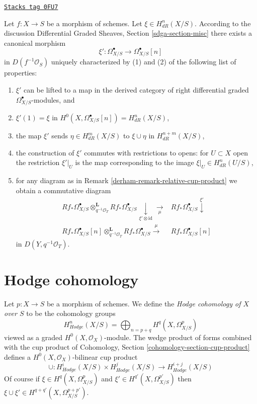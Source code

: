 \begin{remark}
\label{derham-remark-cup-product-as-a-map}
\href{https://stacks.math.columbia.edu/tag/0FU7}{\texttt{Stacks tag 0FU7}}

Let $f : X \to S$ be a morphism of schemes. Let $\xi \in H_{dR}^n(X/S)$.
According to the discussion
Differential Graded Sheaves, Section \ref{sdga-section-misc}
there exists a canonical morphism
$$
\xi' : \Omega^\bullet_{X/S} \to \Omega^\bullet_{X/S}[n]
$$
in $D(f^{-1}\mathcal{O}_S)$ uniquely characterized by
(1) and (2) of the following list of properties:
\begin{enumerate}
\item $\xi'$ can be lifted to a map in the derived category of right
differential graded $\Omega^\bullet_{X/S}$-modules, and
\item $\xi'(1) = \xi$ in
$H^0(X, \Omega^\bullet_{X/S}[n]) = H^n_{dR}(X/S)$,
\item the map $\xi'$ sends $\eta \in H^m_{dR}(X/S)$
to $\xi \cup \eta$ in $H^{n + m}_{dR}(X/S)$,
\item the construction of $\xi'$ commutes with restrictions to
opens: for $U \subset X$ open the restriction $\xi'|_U$ is
the map corresponding to the image $\xi|_U \in H^n_{dR}(U/S)$,
\item for any diagram as in Remark \ref{derham-remark-relative-cup-product}
we obtain a commutative diagram
$$
\begin{array}{cc}Rf_*\Omega^\bullet_{X/S}
\otimes_{q^{-1}\mathcal{O}_T}^\mathbf{L}
Rf_*\Omega^\bullet_{X/S} \underset{\xi' \otimes \text{id}}{\downarrow}\underset{\mu}{\longrightarrow} & Rf_*\Omega^\bullet_{X/S} \overset{\xi'}{\downarrow} \\ Rf_*\Omega^\bullet_{X/S}[n]
\otimes_{q^{-1}\mathcal{O}_T}^\mathbf{L}
Rf_*\Omega^\bullet_{X/S}
\overset{\mu}{\longrightarrow} & Rf_*\Omega^\bullet_{X/S}[n]\end{array}
$$
in $D(Y, q^{-1}\mathcal{O}_T)$.
\end{enumerate}
\end{remark}

\section{Hodge cohomology}
\label{derham-section-hodge-cohomology}
Let $p : X \to S$ be a morphism of schemes. We define the
{\it Hodge cohomology of $X$ over $S$} to be the cohomology groups
$$
H^n_{Hodge}(X/S) = \bigoplus\nolimits_{n = p + q} H^q(X, \Omega^p_{X/S})
$$
viewed as a graded $H^0(X, \mathcal{O}_X)$-module. The wedge product
of forms combined with the cup product of
Cohomology, Section \ref{cohomology-section-cup-product}
defines a $H^0(X, \mathcal{O}_X)$-bilinear cup product
$$
\cup :
H^i_{Hodge}(X/S) \times H^j_{Hodge}(X/S)
\longrightarrow
H^{i + j}_{Hodge}(X/S)
$$
Of course if $\xi \in H^q(X, \Omega^p_{X/S})$ and
$\xi' \in H^{q'}(X, \Omega^{p'}_{X/S})$ then $\xi \cup \xi' \in
H^{q + q'}(X, \Omega^{p + p'}_{X/S})$.

